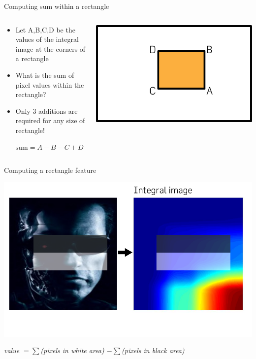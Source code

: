 \documentclass[compress]{beamer}
\begin{document}
\begin{frame}{Computing sum within a rectangle}

    \begin{columns}
        \begin{column}{0.5\linewidth}
 \begin{itemize}
\item   Let A,B,C,D be the values of the integral image at the corners of a
  rectangle
\item   What is the sum of pixel values within the rectangle?
\item<2>
  Only 3 additions are required for any size of rectangle!

         $\text{sum} = A -B - C + D$
\end{itemize}

         \end{column}
        \begin{column}{0.5\linewidth}
            \begin{center}
                \includegraphics[width=0.8\linewidth]{integral-image-1}
            \end{center}
        \end{column}
    \end{columns}

\end{frame}

\begin{frame}{Computing a rectangle feature}
    \begin{center}
        \includegraphics[width=0.8\linewidth]{computing-rectangle-feature}
    \end{center}

    \emph{value $= \sum$(pixels in white area) $- \sum$(pixels in black area)}
\end{frame}
\end{document}
